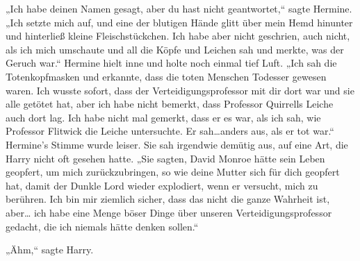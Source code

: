 „Ich habe deinen Namen gesagt, aber du hast nicht geantwortet,“ sagte Hermine. „Ich setzte mich auf, und eine der blutigen Hände glitt über mein Hemd hinunter und hinterließ kleine Fleischstückchen. Ich habe aber nicht geschrien, auch nicht, als ich mich umschaute und all die Köpfe und Leichen sah und merkte, was der Geruch war.“ Hermine hielt inne und holte noch einmal tief Luft. „Ich sah die Totenkopfmasken und erkannte, dass die toten Menschen Todesser gewesen waren. Ich wusste sofort, dass der Verteidigungsprofessor mit dir dort war und sie alle getötet hat, aber ich habe nicht bemerkt, dass Professor Quirrells Leiche auch dort lag. Ich habe nicht mal gemerkt, dass er es war, als ich sah, wie Professor Flitwick die Leiche untersuchte. Er sah…anders aus, als er tot war.“
Hermine’s Stimme wurde leiser. Sie sah irgendwie demütig aus, auf eine Art, die Harry nicht oft gesehen hatte.
„Sie sagten, David Monroe hätte sein Leben geopfert, um mich zurückzubringen, so wie deine Mutter sich für dich geopfert hat, damit der Dunkle Lord wieder explodiert, wenn er versucht, mich zu berühren. Ich bin mir ziemlich sicher, dass das nicht die ganze Wahrheit ist, aber… ich habe eine Menge böser Dinge über unseren Verteidigungsprofessor gedacht, die ich niemals hätte denken sollen.“

„Ähm,“ sagte Harry.

